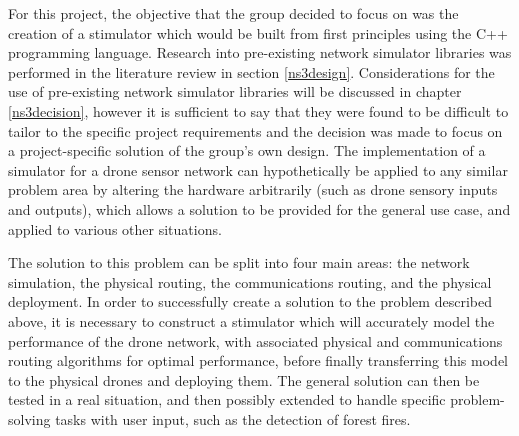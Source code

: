 For this project, the objective that the group decided to focus on was the creation of a stimulator which would be built from first principles using the C++ programming language. Research into pre-existing network simulator libraries was performed in the literature review in section \ref{ns3design}. Considerations for the use of pre-existing network simulator libraries will be discussed in chapter \ref{ns3decision}, however it is sufficient to say that they were found to be difficult to tailor to the specific project requirements and the decision was made to focus on a project-specific solution of the group's own design. The implementation of a simulator for a drone sensor network can hypothetically be applied to any similar problem area by altering the hardware arbitrarily (such as drone sensory inputs and outputs), which allows a solution to be provided for the general use case, and applied to various other situations.

The solution to this problem can be split into four main areas: the network simulation, the physical routing, the communications routing, and the physical deployment. In order to successfully create a solution to the problem described above, it is necessary to construct a stimulator which will accurately model the performance of the drone network, with associated physical and communications routing algorithms for optimal performance, before finally transferring this model to the physical drones and deploying them. The general solution can then be tested in a real situation, and then possibly extended to handle specific problem-solving tasks with user input, such as the detection of forest fires.
 
